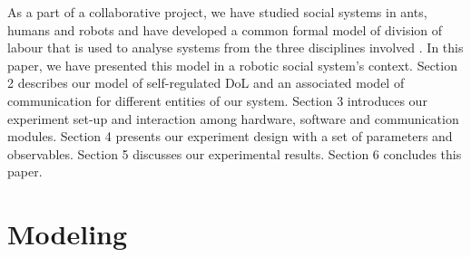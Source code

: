 \documentclass{llncs}
\begin{document}
As a part of a collaborative project, we have studied social systems in ants, humans and robots and have developed a common formal model of division of labour that is used to analyse systems from the three disciplines involved \cite{Elsa}. In this paper, we have presented this model in a robotic social system's context. Section 2 describes our model of self-regulated DoL and an associated model of communication for different entities of our system. Section 3 introduces our experiment set-up and interaction among hardware, software  and communication modules. Section 4 presents our experiment design with a set of parameters and observables. Section 5 discusses our experimental results. Section 6 concludes this paper.
%
\section{Modeling}
\label{sec:model}
\end{document}
